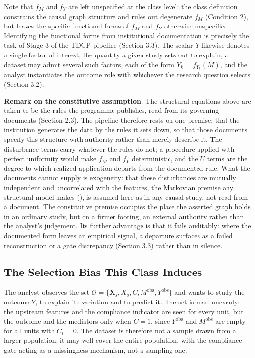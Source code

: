 Note that $f_M$ and $f_Y$ are left unspecified at the class level: the class definition constrains the causal graph structure and rules out degenerate $f_M$ (Condition 2), but leaves the specific functional forms of $f_M$ and $f_Y$ otherwise unspecified. Identifying the functional forms from institutional documentation is precisely the task of Stage 3 of the TDGP pipeline (Section 3.3). The scalar $Y$ likewise denotes a single factor of interest, the quantity a given study sets out to explain; a dataset may admit several such factors, each of the form $Y_k = f_{Y_k}(M)$, and the analyst instantiates the outcome role with whichever the research question selects (Section 3.2).

\textbf{Remark on the constitutive assumption.} The structural equations above are taken to be the rules the programme publishes, read from its governing documents (Section 2.3). The pipeline therefore rests on one premise: that the institution generates the data by the rules it sets down, so that those documents specify this structure with authority rather than merely describe it. The disturbance terms carry whatever the rules do not; a procedure applied with perfect uniformity would make $f_M$ and $f_Y$ deterministic, and the $U$ terms are the degree to which realized application departs from the documented rule. What the documents cannot supply is exogeneity: that these disturbances are mutually independent and uncorrelated with the features, the Markovian premise any structural model makes (), is assumed here as in any causal study, not read from a document. The constitutive premise occupies the place the asserted graph holds in an ordinary study, but on a firmer footing, an external authority rather than the analyst's judgement. Its further advantage is that it fails auditably: where the documented form leaves an empirical signal, a departure surfaces as a failed reconstruction or a gate discrepancy (Section 3.3) rather than in silence.

\subsection{The Selection Bias This Class Induces}

The analyst observes the set $\mathcal{O} = \{\mathbf{X}_s, X_o, C, M^{\text{obs}}, Y^{\text{obs}}\}$ and wants to study the outcome $Y$, to explain its variation and to predict it. The set is read unevenly: the upstream features and the compliance indicator are seen for every unit, but the outcome and the mediators only when $C = 1$, since $Y^{\text{obs}}$ and $M^{\text{obs}}$ are empty for all units with $C_i = 0$. The dataset is therefore not a sample drawn from a larger population; it may well cover the entire population, with the compliance gate acting as a missingness mechanism, not a sampling one.

